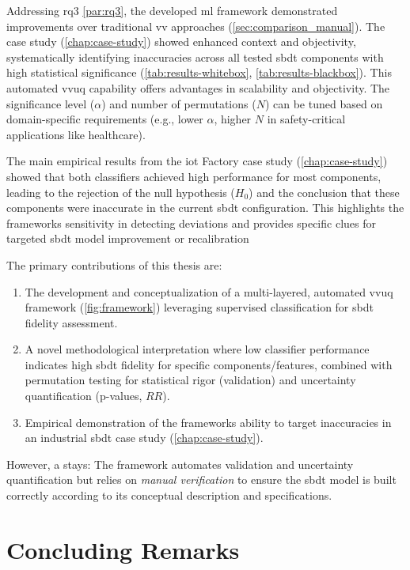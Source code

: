 Addressing \gls{rq}3 \autoref{par:rq3}, the developed \gls{ml} framework demonstrated improvements over traditional \gls{vv} approaches (\autoref{sec:comparison_manual}). The case study (\autoref{chap:case-study}) showed enhanced context and objectivity, systematically identifying inaccuracies across all tested \gls{sbdt} components with high statistical significance (\autoref{tab:results-whitebox}, \autoref{tab:results-blackbox}). This automated \gls{vvuq} capability offers advantages in scalability and objectivity. The significance level ($\alpha$) and number of permutations ($N$) can be tuned based on domain-specific requirements (e.g., lower $\alpha$, higher $N$ in safety-critical applications like healthcare).

The main empirical results from the \gls{iot} Factory case study (\autoref{chap:case-study}) showed that both classifiers achieved high performance for most components, leading to the rejection of the null hypothesis ($H_0$) and the conclusion that these components were inaccurate in the current \gls{sbdt} configuration. This highlights the frameworks sensitivity in detecting deviations and provides specific clues for targeted \gls{sbdt} model improvement or recalibration

The primary contributions of this thesis are:
\begin{enumerate}
  \item The development and conceptualization of a multi-layered, automated \gls{vvuq} framework (\autoref{fig:framework}) leveraging supervised classification for \gls{sbdt} fidelity assessment.
  \item A novel methodological interpretation where low classifier performance indicates high \gls{sbdt} fidelity for specific components/features, combined with permutation testing for statistical rigor (validation) and uncertainty quantification (p-values, $RR$).
  \item Empirical demonstration of the frameworks ability to target inaccuracies in an industrial \gls{sbdt} case study (\autoref{chap:case-study}).
\end{enumerate}

However, a  stays: The framework automates validation and uncertainty quantification but relies on \textit{manual verification} to ensure the \gls{sbdt} model is built correctly according to its conceptual description and specifications.

\section{Concluding Remarks}
\label{sec:conclusion_remarks}

